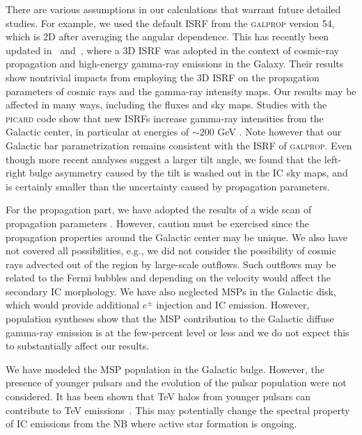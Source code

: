\documentclass[doublespace,nopageskip]{VTthesis}
\begin{document}
There are various assumptions in our calculations that warrant future detailed studies. For example, we used the default ISRF from the \textsc{galprop} version 54, which is 2D after averaging the angular dependence. This has recently been updated in~\citet{2017ApJ...846...67P} and~\citet{2018ApJ...856...45J}, where a 3D ISRF was adopted in the context of cosmic-ray propagation and high-energy gamma-ray emissions in the Galaxy. Their results show nontrivial impacts from employing the 3D ISRF on the propagation parameters of cosmic rays and the gamma-ray intensity maps. Our results may be affected in many ways, including the fluxes and sky maps. Studies with the \textsc{picard} code show that new ISRFs increase gamma-ray intensities from the Galactic center, in particular at energies of $\sim 200 $ GeV \cite{2019APh...107....1N}. Note however that our Galactic bar parametrization remains consistent with the ISRF of \textsc{galprop}. Even though more recent analyses suggest a larger tilt angle, we found that the left-right bulge asymmetry caused by the tilt is washed out in the IC sky maps, and is certainly smaller than the uncertainty caused by propagation parameters.

For the propagation part, we have adopted the results of a wide scan of propagation parameters \cite{2016ApJ...824...16J}. However, caution must be exercised since the propagation properties around the Galactic center may be unique. We also have not covered all possibilities, e.g., we did not consider the possibility of cosmic rays advected out of the region by large-scale outflows. Such outflows may be related to the Fermi bubbles \cite{2015ApJ...808..107C} and depending on the velocity would affect the secondary IC morphology. We have also neglected MSPs in the Galactic disk, which would provide additional $e^\pm$ injection and IC emission. However, population syntheses show that the MSP contribution to the Galactic diffuse gamma-ray emission is at the few-percent level or less \cite{2018ApJ...863..199G} and we do not expect this to substantially affect our results.

We have modeled the MSP population in the Galactic bulge. However, the presence of younger pulsars and the evolution of the pulsar population were not considered. It has been shown that TeV halos from younger pulsars can contribute to TeV emissions~\cite{2018PDU....21...40H}. This may potentially change the spectral property of IC emissions from the NB where active star formation is ongoing.
\end{document}
